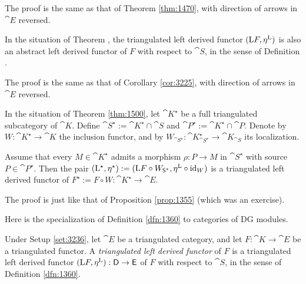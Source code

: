The proof is the same as that of Theorem \ref{thm:1470}, with direction of 
arrows in $\cat{E}$ reversed.

\begin{cor} \label{cor:3226}
In the situation of Theorem \tup{\ref{thm:1500}}, the triangulated left derived 
functor $(\mathrm{L} F, \eta^{\mathrm{L}})$ is also an abstract left derived functor 
of $F$ with respect to $\cat{S}$, in the sense of Definition 
\tup{\ref{dfn:2090}}.
\end{cor}

The proof is the same as that of Corollary \ref{cor:3225}, with direction of 
arrows in $\cat{E}$ reversed.

In the situation of Theorem \ref{thm:1500}, let $\cat{K}^{\star}$ be a full 
triangulated subcategory of $\cat{K}$. Define 
$\cat{S}^{\star} := \cat{K}^{\star} \cap \cat{S}$ and 
$\cat{P}^{\star} := \cat{K}^{\star} \cap \cat{P}$. 
Denote by $W : \cat{K}^{\star} \to \cat{K}$
the inclusion functor, and by 
$W_{\cat{S}^{\star}} : \cat{K}^{\star}_{\cat{S}^{\star}} \to \cat{K}_{\cat{S}}$
its localization. 

\begin{prop} \label{prop:1502}
Assume that every $M \in \cat{K}^{\star}$ admits a morphism 
$\rho : P \to M$ in $\cat{S}^{\star}$ with source $P \in \cat{P}^{\star}$. 
Then the pair 
$(\mathrm{L}^{\star}, \eta^{\star}) := 
(\mathrm{L} F \circ W_{\operatorname{\mathsf{S}}^{\star}}, \eta^{\mathrm{L}} \circ \operatorname{id}_W)$ 
is a triangulated left derived functor of 
$F^{\star} := F \circ W : \cat{K}^{\star} \to \cat{E}$.
\end{prop}

The proof is just like that of Proposition \ref{prop:1355} (which was an 
exercise).

Here is the specialization of Definition \ref{dfn:1360} to categories of DG 
modules.

\begin{dfn} \label{dfn:3237}
Under Setup \ref{set:3236}, let
$\cat{E}$ be a triangulated category, and let 
$F : \cat{K} \to \cat{E}$ be a triangulated functor.  
A {\em triangulated left derived functor}
of $F$ is a triangulated left derived functor 
$(\mathrm{L} F, \eta^{\mathrm{L}}) : \operatorname{\mathsf{D}} \to \operatorname{\mathsf{E}}$
of $F$ with respect to $\cat{S}$, in the sense 
of Definition \ref{dfn:1360}. 
\end{dfn}

